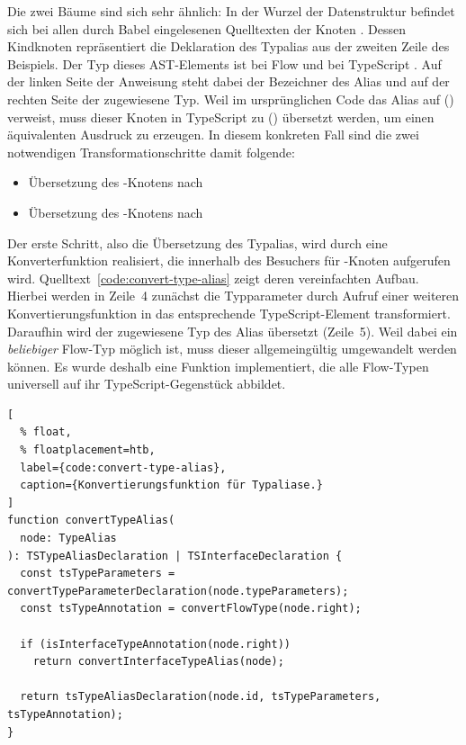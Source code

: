 Die zwei Bäume sind sich sehr ähnlich: In der Wurzel der Datenstruktur befindet sich bei allen durch Babel eingelesenen Quelltexten der Knoten . Dessen Kindknoten repräsentiert die Deklaration des Typalias aus der zweiten Zeile des Beispiels. Der Typ dieses AST-Elements ist bei Flow  und bei TypeScript . Auf der linken Seite der Anweisung steht dabei der Bezeichner des Alias und auf der rechten Seite der zugewiesene Typ.
Weil im ursprünglichen Code das Alias auf  () verweist, muss dieser Knoten in TypeScript zu  () übersetzt werden, um einen äquivalenten Ausdruck zu erzeugen. In diesem konkreten Fall sind die zwei notwendigen Transformationschritte damit folgende:

\begin{itemize}
  \item Übersetzung des -Knotens nach 
  \item Übersetzung des -Knotens nach 
\end{itemize}

Der erste Schritt, also die Übersetzung des Typalias, wird durch eine Konverterfunktion realisiert, die innerhalb des Besuchers für -Knoten aufgerufen wird. Quelltext~\ref{code:convert-type-alias} zeigt deren vereinfachten Aufbau. Hierbei werden in Zeile~4 zunächst die Typparameter durch Aufruf einer weiteren Konvertierungsfunktion in das entsprechende TypeScript-Element transformiert. Daraufhin wird der zugewiesene Typ des Alias übersetzt (Zeile~5). Weil dabei ein \emph{beliebiger} Flow-Typ möglich ist, muss dieser allgemeingültig umgewandelt werden können. Es wurde deshalb eine Funktion  implementiert, die alle Flow-Typen universell auf ihr TypeScript-Gegenstück abbildet.

\begin{lstlisting}[
  % float,
  % floatplacement=htb,
  label={code:convert-type-alias},
  caption={Konvertierungsfunktion für Typaliase.}
]
function convertTypeAlias(
  node: TypeAlias
): TSTypeAliasDeclaration | TSInterfaceDeclaration {
  const tsTypeParameters = convertTypeParameterDeclaration(node.typeParameters);
  const tsTypeAnnotation = convertFlowType(node.right);

  if (isInterfaceTypeAnnotation(node.right))
    return convertInterfaceTypeAlias(node);

  return tsTypeAliasDeclaration(node.id, tsTypeParameters, tsTypeAnnotation);
}
\end{lstlisting}

